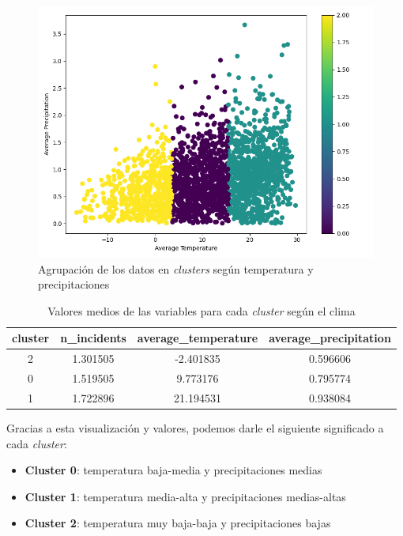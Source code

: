 \documentclass[11pt,a4paper]{article}
\begin{document}
\begin{figure}[H]
    \centering
    \includegraphics[width=.8\linewidth]{climate_clusters.png}
    \caption{Agrupación de los datos en \textit{clusters} según temperatura y precipitaciones}
    \label{fig:clim_clusters}
\end{figure}

\begin{table}[H]
    \centering
\begin{tabular}{|c|c|c|c|}
\hline
\textbf{cluster} & \textbf{n\_incidents} & \textbf{average\_temperature} & \textbf{average\_precipitation} \\ \hline
2                & 1.301505              & -2.401835                     & 0.596606                        \\ \hline
0                & 1.519505              & 9.773176                      & 0.795774                        \\ \hline
1                & 1.722896              & 21.194531                     & 0.938084                        \\ \hline
\end{tabular}
    \caption{Valores medios de las variables para cada \textit{cluster} según el clima}
    \label{tab:clim_clusters_medias}
\end{table}

Gracias a esta visualización y valores, podemos darle el siguiente significado a cada \textit{cluster}:

\begin{itemize}
    \item \textbf{Cluster 0}: temperatura baja-media y precipitaciones medias
    \item \textbf{Cluster 1}: temperatura media-alta y precipitaciones medias-altas
    \item \textbf{Cluster 2}: temperatura muy baja-baja y precipitaciones bajas
\end{itemize}
\end{document}
